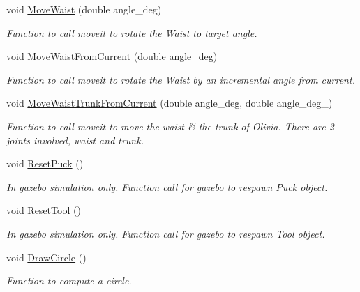 \begin{DoxyCompactItemize}
void \hyperlink{structManipulate_a1066742e96c25662bc7b8869ee3f2e9a}{Move\+Waist} (double angle\+\_\+deg)
\begin{DoxyCompactList}\small\item\em Function to call moveit to rotate the Waist to target angle. \end{DoxyCompactList}\item 
void \hyperlink{structManipulate_af8c10b24461040330efbe1d163b455f7}{Move\+Waist\+From\+Current} (double angle\+\_\+deg)
\begin{DoxyCompactList}\small\item\em Function to call moveit to rotate the Waist by an incremental angle from current. \end{DoxyCompactList}\item 
void \hyperlink{structManipulate_a4b1a50327ead8dd1414718942b36d7e6}{Move\+Waist\+Trunk\+From\+Current} (double angle\+\_\+deg, double angle\+\_\+deg\+\_)
\begin{DoxyCompactList}\small\item\em Function to call moveit to move the waist \& the trunk of Olivia. There are 2 joints involved, waist and trunk. \end{DoxyCompactList}\item 
\mbox{\label{structManipulate_ae44202238a969a4ddeee742b07576c34}} 
void \hyperlink{structManipulate_ae44202238a969a4ddeee742b07576c34}{Reset\+Puck} ()
\begin{DoxyCompactList}\small\item\em In gazebo simulation only. Function call for gazebo to respawn Puck object. \end{DoxyCompactList}\item 
\mbox{\label{structManipulate_ad5bff0cebc6324bfd5669d17aa4b11a1}} 
void \hyperlink{structManipulate_ad5bff0cebc6324bfd5669d17aa4b11a1}{Reset\+Tool} ()
\begin{DoxyCompactList}\small\item\em In gazebo simulation only. Function call for gazebo to respawn Tool object. \end{DoxyCompactList}\item 
\mbox{\label{structManipulate_a6917611555f9760c46d2fd9324203c37}} 
void \hyperlink{structManipulate_a6917611555f9760c46d2fd9324203c37}{Draw\+Circle} ()
\begin{DoxyCompactList}\small\item\em Function to compute a circle. \end{DoxyCompactList}\item 

\end{DoxyCompactItemize}
